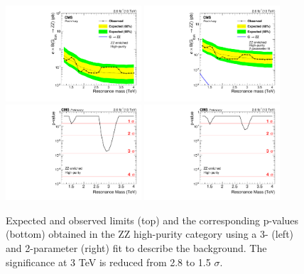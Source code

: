 \begin{figure}[h!]
\centering
\includegraphics[width=0.45\textwidth]{figures/analysis/search1/AN-15-211/limits/brazilianFlag_BulkZZ_ZZHP_13TeV.pdf}
\includegraphics[width=0.45\textwidth]{figures/analysis/search1/AN-15-211/limits/brazilianFlag_BulkZZ_ZZHP_2parFit__13TeV.pdf}\\
\includegraphics[width=0.45\textwidth]{figures/analysis/search1/AN-15-211/pvalues/pvalue_BulkZZinZZ_high_purity.pdf}
\includegraphics[width=0.45\textwidth]{figures/analysis/search1/AN-15-211/pvalues/pvalue_BulkZZinZZ_high_purity_2par.pdf}
\caption{Expected and observed limits (top) and the corresponding p-values (bottom) obtained in the ZZ high-purity category using a 3- (left) and 2-parameter (right) fit to describe the background. The significance at 3 TeV is reduced from 2.8 to 1.5 $\sigma$.}
\label{fig:searchI:Limits_ZZHP}
\end{figure}
